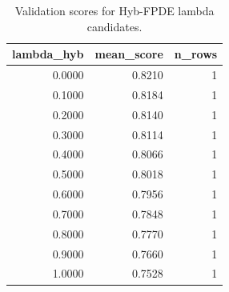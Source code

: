 \begin{table}[t]
\caption{Validation scores for Hyb-FPDE lambda candidates.}
\label{tab:lambda_distribution_computed}
\centering
\begin{tabular}{rrr}
\toprule
lambda\_hyb & mean\_score & n\_rows \\
\midrule
0.0000 & 0.8210 & 1 \\
0.1000 & 0.8184 & 1 \\
0.2000 & 0.8140 & 1 \\
0.3000 & 0.8114 & 1 \\
0.4000 & 0.8066 & 1 \\
0.5000 & 0.8018 & 1 \\
0.6000 & 0.7956 & 1 \\
0.7000 & 0.7848 & 1 \\
0.8000 & 0.7770 & 1 \\
0.9000 & 0.7660 & 1 \\
1.0000 & 0.7528 & 1 \\
\bottomrule
\end{tabular}

\end{table}
